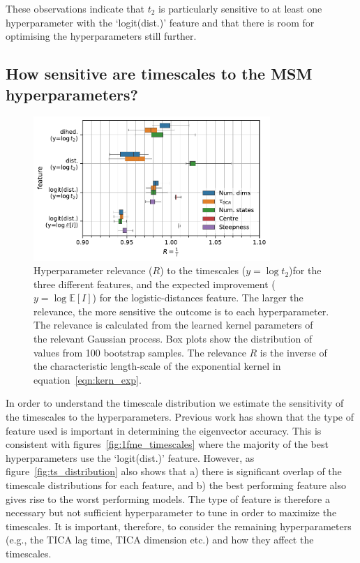 \documentclass[journal=jacsat,manuscript=article]{achemso}
\begin{document}
These observations indicate that $t_2$ is particularly sensitive to at least one hyperparameter with the `logit(dist.)' feature and that there is room for optimising the hyperparameters still further. 

\subsection{How sensitive are timescales to the MSM hyperparameters?}\label{sec:sensitivity}

\begin{figure}
    \centering
    \includegraphics[width=0.8\textwidth]{figures/sensitivity.pdf}
    \caption{Hyperparameter relevance ($R$) to the timescales ($y=\log{t_{2}}$)for the three different features,  and the expected improvement ($y=\log{\mathbb{E}[I]}$) for the logistic-distances feature. The larger the relevance, the more sensitive the outcome is to each hyperparameter.  The relevance is calculated from the learned kernel parameters of the relevant Gaussian process. Box plots show the distribution of values from \num{100} bootstrap samples. The relevance $R$ is the inverse of the characteristic length-scale of the exponential kernel in equation~\ref{eqn:kern_exp}. }
    \label{fig:sensitivity}
\end{figure}

In order to understand the timescale distribution we estimate the sensitivity of the timescales to the hyperparameters. Previous work has shown that the type of feature used is important in determining the eigenvector accuracy. This is consistent with figures~\ref{fig:1fme_timescales}  where the majority of the best hyperparameters use the `logit(dist.)' feature.  However, as figure~\ref{fig:ts_distribution} also shows that a) there is significant overlap of the timescale distributions for each feature, and b) the best performing feature also gives rise to the worst performing models. The type of feature is therefore a necessary but not sufficient hyperparameter to tune in order to maximize the timescales. It is important, therefore, to consider the remaining hyperparameters (e.g., the TICA lag time, TICA dimension etc.) and how they affect the timescales.  
\end{document}
